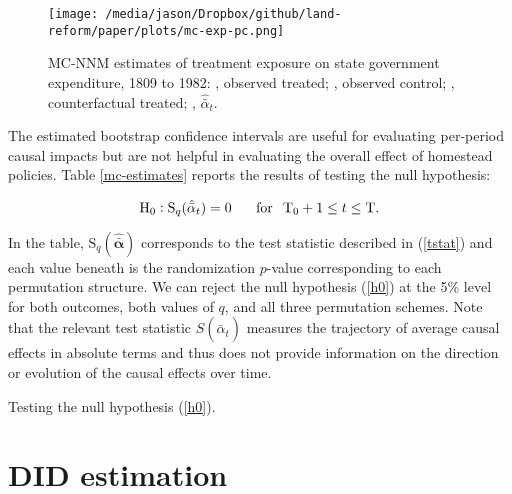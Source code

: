 \begin{figure}[htbp]
	\centering
	\texttt{[image: /media/jason/Dropbox/github/land-reform/paper/plots/mc-exp-pc.png]}
	\caption{MC-NNM estimates of treatment exposure on state government expenditure, 1809 to 1982:
		{\color{Darjeeling15}{\sampleline{}}}, observed treated;
		{}, observed control;
		{}, counterfactual treated;
		{}, $\hat{\bar{\alpha}}_{t}$.\label{mc-estimates-exp-pc}} 
\end{figure}

The estimated bootstrap confidence intervals are useful for evaluating per-period causal impacts but are not helpful in evaluating the overall effect of homestead policies. Table \ref{mc-estimates} reports the results of testing the null hypothesis:

\begin{equation} \label{h0}
\text{H}_0: \text{S}_q (\hat{\bar{\alpha}}_{t}) = 0  \, \hspace{5mm} \,  \text{for} \, \hspace{2mm}  \text{T}_0 + 1 \leq t \leq \text{T}.
\end{equation}
\noindent

In the table, $\text{S}_q (\boldsymbol{\hat{\bar{\alpha}}})$ corresponds to the test statistic described in (\ref{tstat}) and each value beneath is the randomization $p$-value corresponding to each permutation structure. We can reject the null hypothesis (\ref{h0}) at the 5\% level for both outcomes, both values of $q$, and all three permutation schemes. Note that the relevant test statistic $S (\hat{\bar{\alpha}}_{t})$ measures the trajectory of average causal effects in absolute terms and thus does not provide information on the direction or evolution of the causal effects over time.

\begin{table}[htbp]
	\captionsetup{font=normalsize}
	\caption{Testing the null hypothesis (\ref{h0}).\label{mc-estimates}}
	\begin{center}
		
	\end{center}
\end{table}

\section{DID estimation} \label{DID}

